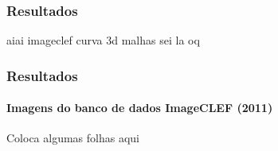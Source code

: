 \begin{frame}
\frametitle{Resultados}

aiai imageclef curva 3d malhas sei la oq
	
\end{frame}


\begin{frame}
\frametitle{Resultados}
\framesubtitle{Imagens do banco de dados ImageCLEF (2011) \cite{imageclef2011}}

Coloca algumas folhas aqui

\end{frame}


